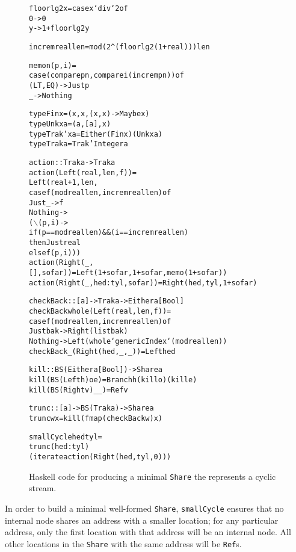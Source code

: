 \documentclass[envcountsect]{llncs}
\newcommand{\share}{{\tt Share} }
\begin{document}
\begin{figure}
\begin{alltt}
floorlg2 x = case x `div` 2 of
               0 -> 0
               y -> 1 + floorlg2 y

increm real len = mod (2^(floorlg2 (1+real))) len

memo n (p,i) =
    case (compare p n, compare i (increm p n)) of
      (LT,EQ) -> Just p
      _ -> Nothing

type Fin x = (x,x,(x,x) -> Maybe x)
type Unk x a = (a,[a],x)
type Trak' x a = Either (Fin x) (Unk x a)
type Trak a = Trak' Integer a

action :: Trak a -> Trak a
action (Left (real,len,f)) =
    Left (real+1,len,
          case f (mod real len, increm real len) of
            Just _ -> f
            Nothing -> 
                (\(\backslash\)(p,i) ->
                 if (p == mod real len) && (i == increm real len)
                 then Just real
                 else f (p,i)))
action (Right (_,[],sofar)) = Left (1+sofar,1+sofar,memo (1+sofar))
action (Right (_,hed:tyl,sofar)) = Right (hed,tyl,1+sofar)

checkBack :: [a] -> Trak a -> Either a [Bool]
checkBack whole (Left (real,len,f)) =
    case f (mod real len,increm real len) of
      Just bak -> Right (list bak)
      Nothing -> Left (whole `genericIndex` (mod real len)) 
checkBack _ (Right (hed,_,_)) = Left hed

kill :: BS (Either a [Bool]) -> Share a
kill (BS (Left h) o e) = Branch h (kill o) (kill e)
kill (BS (Right v) _ _) = Ref v
    
trunc :: [a] -> BS (Trak a) -> Share a
trunc w x = kill (fmap (checkBack w) x)

smallCycle hed tyl =
  trunc (hed:tyl)
    (iterate action (Right (hed,tyl,0)))
\end{alltt}
\caption{Haskell code for producing a minimal \share the represents a cyclic stream.}
\label{cycleDetails}
\end{figure}

In order to build a minimal well-formed {\tt Share}, {\tt smallCycle} ensures that no internal node shares an address with a smaller location;
for any particular address, only the first location with that address will be an internal node.
All other locations in the \share with the same address will be {\tt Ref}s.
\end{document}
